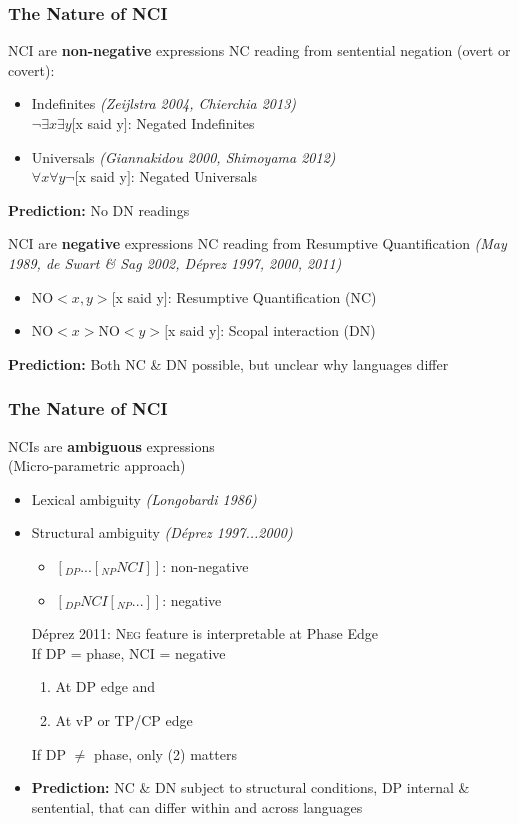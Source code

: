 \documentclass{beamer}
\begin{document}
\begin{frame}
\frametitle{The Nature of NCI}
\begin{block}{NCI are \textbf{non-negative} expressions}
NC reading from sentential negation (overt or covert):
\begin{itemize}
\item Indefinites \textit{(Zeijlstra 2004, Chierchia 2013)}\\
$\neg \exists x \exists y [$x said y$]$: Negated Indefinites\\
\item Universals \textit{(Giannakidou 2000, Shimoyama 2012)}\\
$\forall x \forall y \neg [$x said y$]$: Negated Universals
\end{itemize}
\textbf{Prediction:} No DN readings
\end{block}
\begin{block}{NCI are \textbf{negative} expressions}
NC reading from Resumptive Quantification \textit{(May 1989, de Swart \& Sag 2002, D\'eprez 1997, 2000, 2011)}
\begin{itemize}
\item NO$<x,y>[$x said y$]$: Resumptive Quantification (NC)
\item NO$<x>$NO$<y>[$x said y$]$: Scopal interaction (DN)
\end{itemize}
\textbf{Prediction:} Both NC \& DN possible, but unclear why languages differ

\end{block}
\end{frame}

\begin{frame}
\frametitle{The Nature of NCI}
\begin{block}{NCIs are \textbf{ambiguous} expressions\\ (Micro-parametric approach)}
\begin{itemize}
\item Lexical ambiguity \textit{(Longobardi 1986)}
\item Structural ambiguity \textit{(D\'eprez 1997...2000)}\\
\begin{itemize}
\item $[_{DP} ... [_{NP} NCI ]]$: non-negative\\
\item $[_{DP} NCI [_{NP} ... ]]$: negative\\
\end{itemize}
D\'eprez 2011: \textsc{Neg} feature is interpretable at Phase Edge\\
If DP = phase, NCI = negative
\begin{enumerate}
\item At DP edge and
\item At vP or TP/CP edge
\end{enumerate}
If DP $\neq$ phase, only (2) matters
\item \textbf{Prediction:} NC \& DN subject to structural conditions, DP internal \& sentential, that can differ within and across languages
\end{itemize}
\end{block}
\end{frame}
\end{document}
